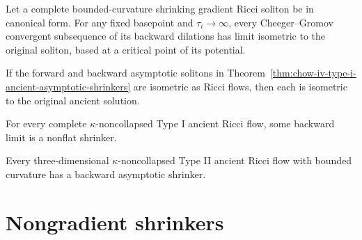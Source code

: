 \begin{proposition}
\label{prop:chow-iv-shrinker-backward-limit-isometric}
Let a complete bounded-curvature shrinking gradient Ricci soliton be in
canonical form.  For any fixed basepoint and \(\tau_i\to\infty\), every
Cheeger--Gromov convergent subsequence of its backward dilations has limit
isometric to the original soliton, based at a critical point of its potential.
\end{proposition}

\begin{theorem}
\label{thm:chow-iv-equal-asymptotic-shrinkers-rigidity}
If the forward and backward asymptotic solitons in
Theorem~\ref{thm:chow-iv-type-i-ancient-asymptotic-shrinkers} are isometric
as Ricci flows, then each is isometric to the original ancient solution.
\end{theorem}

\begin{theorem}
\label{thm:chow-iv-type-i-ancient-nonflat-backward-shrinker}
For every complete \(\kappa\)-noncollapsed Type I ancient Ricci flow, some
backward limit is a nonflat shrinker.
\end{theorem}

\begin{theorem}
\label{thm:chow-iv-three-dimensional-type-ii-asymptotic-shrinker}
Every three-dimensional \(\kappa\)-noncollapsed Type II ancient Ricci flow
with bounded curvature has a backward asymptotic shrinker.
\end{theorem}

\section{Nongradient shrinkers}

